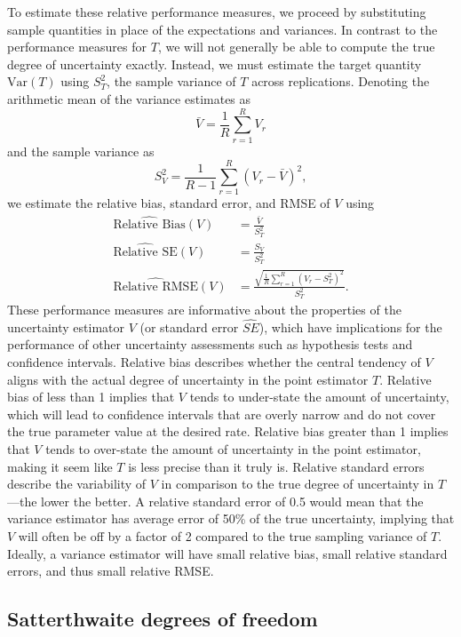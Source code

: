\documentclass[
]{book}
\newcommand{\Var}{\text{Var}}
\begin{document}
To estimate these relative performance measures, we proceed by substituting sample quantities in place of the expectations and variances.
In contrast to the performance measures for \(T\), we will not generally be able to compute the true degree of uncertainty exactly.
Instead, we must estimate the target quantity \(\Var(T)\) using \(S_T^2\), the sample variance of \(T\) across replications.
Denoting the arithmetic mean of the variance estimates as
\[
\bar{V} = \frac{1}{R} \sum_{r=1}^R V_r
\]
and the sample variance as
\[
S_V^2 = \frac{1}{R - 1}\sum_{r=1}^R \left(V_r - \bar{V}\right)^2,
\]
we estimate the relative bias, standard error, and RMSE of \(V\) using
\[
\begin{aligned}
\widehat{\text{Relative Bias}}(V) &= \frac{\bar{V}}{S_T^2} \\
\widehat{\text{Relative SE}}(V) &= \frac{S_V}{S_T^2} \\
\widehat{\text{Relative RMSE}}(V) &= \frac{\sqrt{\frac{1}{R}\sum_{r=1}^R\left(V_r - S_T^2\right)^2}}{S_T^2}.
\end{aligned}
\label{eq:relative-bias-SE-RMSE-estimators}
\]
These performance measures are informative about the properties of the uncertainty estimator \(V\) (or standard error \(\widehat{SE}\)), which have implications for the performance of other uncertainty assessments such as hypothesis tests and confidence intervals.
Relative bias describes whether the central tendency of \(V\) aligns with the actual degree of uncertainty in the point estimator \(T\).
Relative bias of less than 1 implies that \(V\) tends to under-state the amount of uncertainty, which will lead to confidence intervals that are overly narrow and do not cover the true parameter value at the desired rate.
Relative bias greater than 1 implies that \(V\) tends to over-state the amount of uncertainty in the point estimator, making it seem like \(T\) is less precise than it truly is.
Relative standard errors describe the variability of \(V\) in comparison to the true degree of uncertainty in \(T\)---the lower the better.
A relative standard error of 0.5 would mean that the variance estimator has average error of 50\% of the true uncertainty, implying that \(V\) will often be off by a factor of 2 compared to the true sampling variance of \(T\).
Ideally, a variance estimator will have small relative bias, small relative standard errors, and thus small relative RMSE.

\subsection{Satterthwaite degrees of freedom}\label{satterthwaite-degrees-of-freedom}
\end{document}
